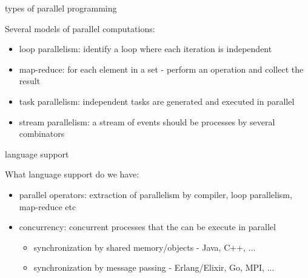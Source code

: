\begin{frame}{types of parallel programming}

Several models of parallel computations:

\pause\vspace{20pt}

\begin{itemize}
 \pause\item loop parallelism: identify a loop where each iteration is independent
 \pause\item map-reduce: for each element in a set - perform an operation and collect the result
 \pause\item task parallelism: independent tasks are generated and executed in parallel
 \pause\item stream parallelism: a stream of events should be processes by several combinators
\end{itemize}

\pause\vspace{10pt}{\em A concurrent program could be executed in parallel but the focus is then concurrency not parallelism.}
\end{frame}

\begin{frame}{language support}

What language support do we have:

\begin{itemize}
 \pause\item parallel operators: extraction of parallelism by compiler, loop parallelism, map-reduce etc
 \pause\item concurrency:  concurrent processes that the can be execute in parallel
   \begin{itemize}
     \pause\item synchronization by shared memory/objects - Java, C++, ...
     \pause\item synchronization by message passing - Erlang/Elixir, Go, MPI, ...
   \end{itemize}
\end{itemize}

\end{frame}


